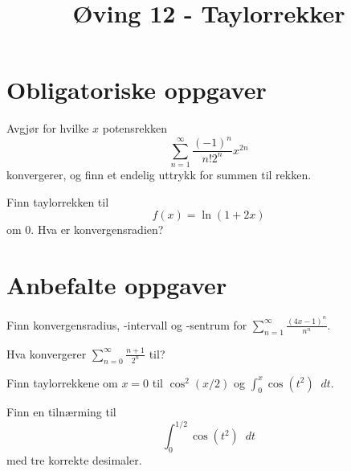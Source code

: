 \documentclass[a4paper,norsk,11pt]{interaktiv}
\title{Øving 12 - Taylorrekker}
\newcommand{\dee}{\mathop{}\!{d}}
\begin{document}

\maketitle







\section*{Obligatoriske oppgaver}

\begin{oppgave}{1} 
  Avgjør for hvilke $x$ potensrekken
  \begin{equation*}
    \sum_{n=1}^{\infty} \frac{(-1)^n}{n!2^n}x^{2n}
  \end{equation*}
  konvergerer, og finn et endelig uttrykk for summen til rekken.
\end{oppgave}

\begin{oppgave}{2}
  Finn taylorrekken til 
  \begin{equation*}
    f(x) = \ln(1+2x)
  \end{equation*} 
  om 0. Hva er konvergensradien?
\end{oppgave}


\section*{Anbefalte oppgaver}

\begin{oppgave}{1}
  Finn konvergensradius, -intervall og -sentrum for
  $\sum_{n=1}^{\infty}\frac{(4x-1)^{n}}{n^n}.$
  \\[-6pt]
\end{oppgave}

\begin{oppgave}{2}
  Hva konvergerer $\sum_{n=0}^{\infty}\frac{n+1}{2^n}$ til?
  \\[-6pt]
\end{oppgave}

\begin{oppgave}{3}
Finn taylorrekkene om $x =
0$ til  
    $\cos^2 (x/2)$
og 
    $\displaystyle\int_0^x \cos(t^2)\dee t$.
\end{oppgave}

\begin{oppgave}{4}
  Finn en tilnærming til 
  \begin{equation*}
    \int_0^{1/2} \cos(t^2)\dee t
  \end{equation*}
  med tre korrekte desimaler.
  \\[-6pt]
\end{oppgave}
\end{document}
